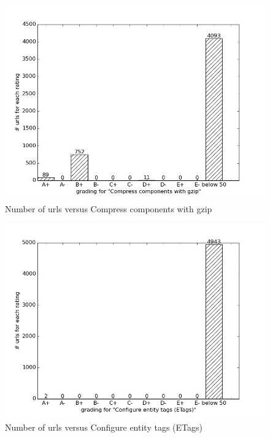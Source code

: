 \documentclass[conference]{IEEEtran}
\begin{document}
\begin{figure}[ht]
 \centering
  \includegraphics[scale=0.33]{new-img-jpg/vlab-jpg/Compress components with gzip.jpg}
\caption{Number of urls versus Compress components with gzip}	
\label{fig:ccg}
\end{figure}

\begin{figure}[ht]
 \centering
  \includegraphics[scale=0.33]{new-img-jpg/vlab-jpg/Configure entity tags (ETags).jpg}
\caption{Number of urls versus Configure entity tags (ETags)}	
\label{fig:configure-et}
\end{figure}
\end{document}
